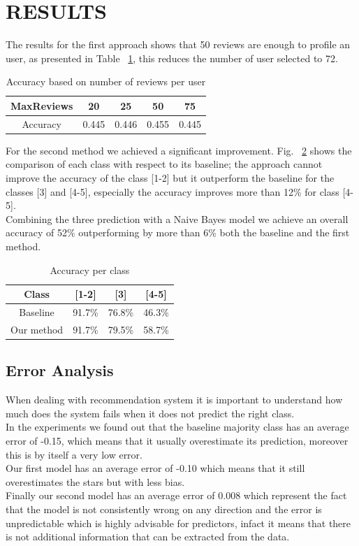 \documentclass[a4paper, 10pt, conference]{ieeeconf}      %
\begin{document}
\section{RESULTS}
The results for the first approach shows that 50 reviews are enough to profile an user, as presented in Table ~\ref{tab}, this reduces the number of user selected to 72.\\
\begin{table}[]
	\centering
	\caption{Accuracy based on number of reviews per user}
	\label{tab}
	\begin{tabular}{|c|c|c|c|c|}
		\hline
		MaxReviews & 20    & 25    & 50    & 75    \\ \hline
		Accuracy   & 0.445 & 0.446 & 0.455 & 0.445 \\ \hline
	\end{tabular}
\end{table}
For the second method we achieved a significant improvement.
Fig. ~\ref{class} shows the comparison of each class with respect to its baseline; the approach cannot improve the accuracy of the class [1-2] but it outperform the baseline for the classes [3] and [4-5], especially the accuracy improves more than 12\% for class [4-5].\\
Combining the three prediction with a Naive Bayes model we achieve an overall accuracy of 52\% outperforming by more than 6\% both the baseline and the first method.
\begin{table}[]
	\centering
	\caption{Accuracy per class}
	\label{class}
	\begin{tabular}{|c|c|c|c|}
		\hline
		Class      & {[}1-2{]} & {[}3{]} & {[}4-5{]} \\ \hline
		Baseline   & 91.7\%    & 76.8\%  & 46.3\%    \\ \hline
		Our method & 91.7\%    & 79.5\%  & 58.7\%    \\ \hline
	\end{tabular}
\end{table}
\subsection{Error Analysis}
When dealing with recommendation system it is important to understand how much does the system fails when it does not predict the right class.\\
In the experiments we found out that the baseline majority class has an average error of -0.15, which means that it usually overestimate its prediction, moreover this is by itself a very low error.\\
Our first model has an average error of -0.10 which means that it still overestimates the stars but with less bias.\\
Finally our second model has an average error of 0.008 which represent the fact that the model is not consistently wrong on any direction and the error is unpredictable which is highly advisable for predictors, infact it means that there is not additional information that can be extracted from the data.
\end{document}
